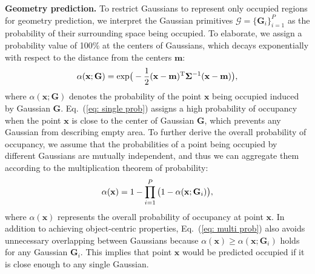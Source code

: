 \textbf{Geometry prediction.}
To restrict Gaussians to represent only occupied regions for geometry prediction, we interpret the Gaussian primitives $\mathcal{G}=\{\mathbf{G}_i\}_{i=1}^{P}$ as the probability of their surrounding space being occupied.
To elaborate, we assign a probability value of 100\% at the centers of Gaussians, which decays exponentially with respect to the distance from the centers $\mathbf{m}$:
\begin{equation}
    \alpha(\mathbf{x};\mathbf{G}) = {\rm{exp}}\big(-\frac{1}{2}(\mathbf{x}-\mathbf{m})^{\rm T} \mathbf{\Sigma}^{-1} (\mathbf{x}-\mathbf{m})\big),
    \label{eq: single prob}
\end{equation}
where $\alpha(\mathbf{x};\mathbf{G})$ denotes the probability of the point $\mathbf{x}$ being occupied induced by Gaussian $\mathbf{G}$.
Eq.~(\ref{eq: single prob}) assigns a high probability of occupancy when the point $\mathbf{x}$ is close to the center of Gaussian $\mathbf{G}$, which prevents any Gaussian from describing empty area.
To further derive the overall probability of occupancy, we assume that the probabilities of a point being occupied by different Gaussians are mutually independent, and thus we can aggregate them according to the multiplication theorem of probability:
\vspace{-1mm}
\begin{equation}
    \alpha(\mathbf{x}) = 1 - \prod_{i=1}^{P}\big(1 - \alpha(\mathbf{x};\mathbf{G}_i)\big),
    \label{eq: multi prob}
    \vspace{-1mm}
\end{equation}
where $\alpha(\mathbf{x})$ represents the overall probability of occupancy at point $\mathbf{x}$. 
In addition to achieving object-centric properties, Eq.~(\ref{eq: multi prob}) also avoids unnecessary overlapping between Gaussians because $\alpha(\mathbf{x}) \ge \alpha(\mathbf{x};\mathbf{G}_i)$ holds for any Gaussian $\mathbf{G}_i$.
This implies that point $\mathbf{x}$ would be predicted occupied if it is close enough to any single Gaussian.


